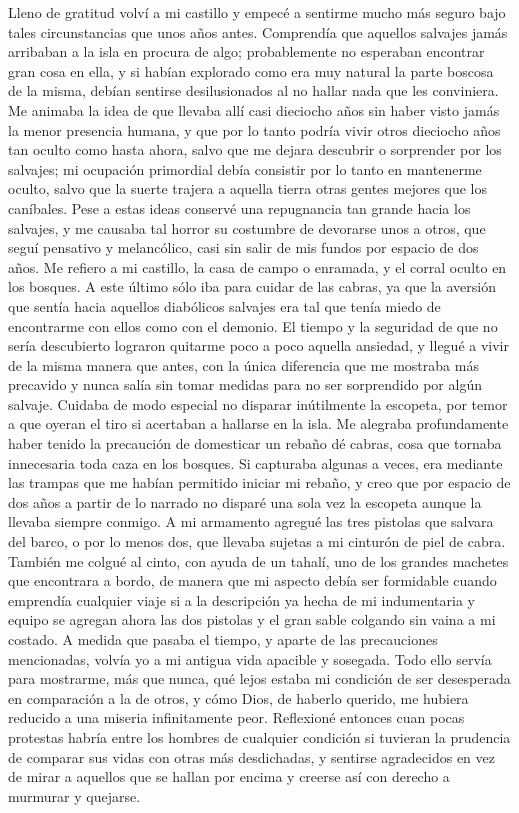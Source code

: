 \documentclass{novela}
\begin{document}
    Lleno de gratitud volví a mi castillo y empecé a sentirme mucho más seguro bajo tales circunstancias que unos años antes. Comprendía que aquellos salvajes jamás arribaban a la isla en procura de algo; probablemente no esperaban encontrar gran cosa en ella, y si habían explorado como era muy natural la parte boscosa de la misma, debían sentirse desilusionados al no hallar nada que les conviniera. Me animaba la idea de que llevaba allí casi dieciocho años sin haber visto jamás la menor presencia humana, y que por lo tanto podría vivir otros dieciocho años tan oculto como hasta ahora, salvo que me dejara descubrir o sorprender por los salvajes; mi ocupación primordial debía consistir por lo tanto en mantenerme oculto, salvo que la suerte trajera a aquella tierra otras gentes mejores que los caníbales.
    Pese a estas ideas conservé una repugnancia tan grande hacia los salvajes, y me causaba tal horror su costumbre de devorarse unos a otros, que seguí pensativo y melancólico, casi sin salir de mis fundos por espacio de dos años. Me refiero a mi castillo, la casa de campo o enramada, y el corral oculto en los bosques. A este último sólo iba para cuidar de las cabras, ya que la aversión que sentía hacia aquellos diabólicos salvajes era tal que tenía miedo de encontrarme con ellos como con el demonio.
    El tiempo y la seguridad de que no sería descubierto lograron quitarme poco a poco aquella ansiedad, y llegué a vivir de la misma manera que antes, con la única diferencia que me mostraba más precavido y nunca salía sin tomar medidas para no ser sorprendido por algún salvaje. Cuidaba de modo especial no disparar inútilmente la escopeta, por temor a que oyeran el tiro si acertaban a hallarse en la isla. Me alegraba profundamente haber tenido la precaución de domesticar un rebaño dé cabras, cosa que tornaba innecesaria toda caza en los bosques. Si capturaba algunas a veces, era mediante las trampas que me habían permitido iniciar mi rebaño, y creo que por espacio de dos años a partir de lo narrado no disparé una sola vez la escopeta aunque la llevaba siempre conmigo. A mi armamento agregué las tres pistolas que salvara del barco, o por lo menos dos, que llevaba sujetas a mi cinturón de piel de cabra. También me colgué al cinto, con ayuda de un tahalí, uno de los grandes machetes que encontrara a bordo, de manera que mi aspecto debía ser formidable cuando emprendía cualquier viaje si a la descripción ya hecha de mi indumentaria y equipo se agregan ahora las dos pistolas y el gran sable colgando sin vaina a mi costado.
    A medida que pasaba el tiempo, y aparte de las precauciones mencionadas, volvía yo a mi antigua vida apacible y sosegada. Todo ello servía para mostrarme, más que nunca, qué lejos estaba mi condición de ser desesperada en comparación a la de otros, y cómo Dios, de haberlo querido, me hubiera reducido a una miseria infinitamente peor. Reflexioné entonces cuan pocas protestas habría entre los hombres de cualquier condición si tuvieran la prudencia de comparar sus vidas con otras más desdichadas, y sentirse agradecidos en vez de mirar a aquellos que se hallan por encima y creerse así con derecho a murmurar y quejarse.
\end{document}

